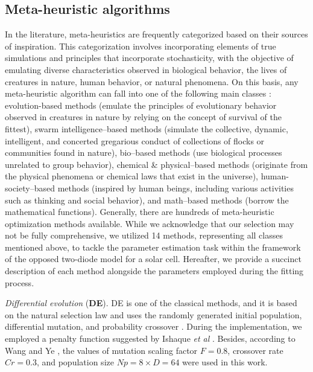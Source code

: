 \documentclass[a4paper,fleqn]{cas-dc}
\begin{document}


 


\subsection{Meta-heuristic algorithms}\label{MHA}
In the literature, meta-heuristics are frequently categorized based on their sources of inspiration.
This categorization involves incorporating elements of true simulations and principles that incorporate stochasticity,
with the objective of emulating diverse characteristics observed in biological behavior, the lives of creatures in nature, human behavior, or natural phenomena.
On this basis, any meta-heuristic algorithm can fall into one of the following main classes \cite{WhiteShark,Gannet,Dandelion}:
evolution-based methods (emulate the principles of evolutionary behavior observed in creatures in nature by relying on the concept of survival of the fittest),
swarm intelligence--based methods (simulate the collective, dynamic, intelligent, and concerted gregarious conduct of collections of flocks or communities found in nature),
bio--based methods (use biological processes unrelated to group behavior),
chemical \& physical--based methods (originate from the physical phenomena or chemical laws that exist in the universe),
human-society--based methods (inspired by human beings, including various activities such as thinking and social behavior),
and math--based methods (borrow the mathematical functions).
Generally, there are hundreds of meta-heuristic optimization methods available.
While we acknowledge that our selection may not be fully comprehensive,
we utilized 14 methods, representing all classes mentioned above,
to tackle the parameter estimation task within the framework of the opposed two-diode model for a solar cell.
Hereafter, we provide a succinct description of each method alongside the parameters employed during the fitting process.

\emph{Differential evolution} (\textbf{DE}).
DE is one of the classical methods,
and  it is based on the natural selection law and uses the randomly generated initial population,
differential mutation, and probability crossover \cite{DEWang}.
During the implementation, we employed a penalty function suggested by Ishaque \emph{et al} \cite{P-DE_Ishaque}.
Besides, according to Wang and Ye \cite{DEWang}, the values of mutation scaling factor $F=0.8$,
crossover rate $C\!r=0.3$, and population size $N\!p=8\times D=64$ were used in this work.
\end{document}
